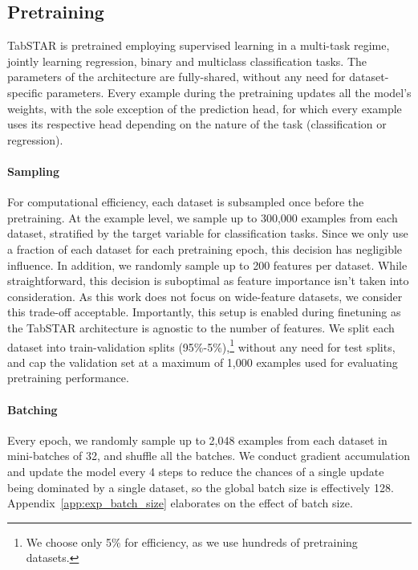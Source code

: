 \subsection{Pretraining}
\label{app:pretrain}

TabSTAR is pretrained employing supervised learning in a multi-task regime, jointly learning regression, binary and multiclass classification tasks. The parameters of the architecture are fully-shared, without any need for dataset-specific parameters. Every example during the pretraining updates all the model's weights, with the sole exception of the prediction head, for which every example uses its respective head depending on the nature of the task (classification or regression).

\paragraph{Sampling} For computational efficiency, each dataset is subsampled once before the pretraining. At the example level, we sample up to 300,000 examples from each dataset, stratified by the target variable for classification tasks. Since we only use a fraction of each dataset for each pretraining epoch, this decision has negligible influence. In addition, we randomly sample up to 200 features per dataset. While straightforward, this decision is suboptimal as feature importance isn't taken into consideration. As this work does not focus on wide-feature datasets, we consider this trade-off acceptable. Importantly, this setup is enabled during finetuning as the TabSTAR architecture is agnostic to the number of features. We split each dataset into train-validation splits (95\%-5\%),\footnote{We choose only 5\% for efficiency, as we use hundreds of pretraining datasets.} without any need for test splits, and cap the validation set at a maximum of 1,000 examples used for evaluating pretraining performance.

\paragraph{Batching} Every epoch, we randomly sample up to 2,048 examples from each dataset in mini-batches of 32, and shuffle all the batches. We conduct gradient accumulation and update the model every 4 steps to reduce the chances of a single update being dominated by a single dataset, so the global batch size is effectively 128. Appendix~\ref{app:exp_batch_size} elaborates on the effect of batch size.


